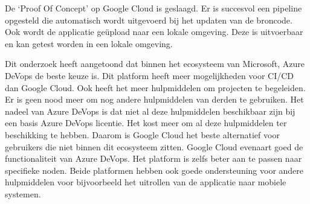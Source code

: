 De ‘Proof Of Concept’ op Google Cloud is geslaagd. Er is succesvol een pipeline opgesteld die automatisch wordt uitgevoerd bij het updaten van de broncode. Ook wordt de applicatie geüpload naar een lokale omgeving. Deze is uitvoerbaar en kan getest worden in een lokale omgeving.

Dit onderzoek heeft aangetoond dat binnen het ecosysteem van Microsoft, Azure DeVops de beste keuze is. Dit platform heeft meer mogelijkheden voor CI/CD dan Google Cloud. Ook heeft het meer hulpmiddelen om projecten te begeleiden. Er is geen nood meer om nog andere hulpmiddelen van derden te gebruiken. Het nadeel van Azure DeVops is dat niet al deze hulpmiddelen beschikbaar zijn bij een basis Azure DeVops licentie. Het kost meer om al deze hulpmiddelen ter beschikking te hebben. Daarom is Google Cloud het beste alternatief voor gebruikers die niet binnen dit ecosysteem zitten. Google Cloud evenaart goed de functionaliteit van Azure DeVops. Het platform is zelfs beter aan te passen naar specifieke noden. Beide platformen hebben ook goede ondersteuning voor andere hulpmiddelen voor bijvoorbeeld het uitrollen van de applicatie naar mobiele systemen.


